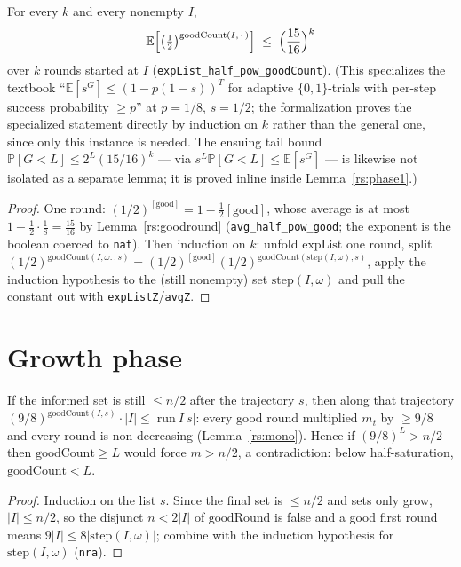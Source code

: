 \begin{lemma}\label{rs:adaptive}
  \rocqok
  For every $k$ and every nonempty $I$,
  \[
    \mathbb{E}\Bigl[\bigl(\tfrac12\bigr)^{\mathrm{goodCount}(I,\,\cdot\,)}\Bigr]
      \;\le\; \Bigl(\frac{15}{16}\Bigr)^{k}
  \]
  over $k$ rounds started at $I$ (\texttt{expList\_half\_pow\_goodCount}).
  (This specializes the textbook
  ``$\mathbb{E}[s^G] \le (1-p(1-s))^T$ for adaptive $\{0,1\}$-trials with
  per-step success probability $\ge p$'' at $p = 1/8$, $s = 1/2$; the
  formalization proves the specialized statement directly by induction on
  $k$ rather than the general one, since only this instance is needed. The
  ensuing tail bound $\mathbb{P}[G < L] \le 2^{L}(15/16)^{k}$ --- via
  $s^{L}\mathbb{P}[G<L] \le \mathbb{E}[s^G]$ --- is likewise not isolated as
  a separate lemma; it is proved inline inside Lemma~\ref{rs:phase1}.)
\end{lemma}
\begin{proof}
  \rocqok
  One round: $(1/2)^{[\mathrm{good}]} = 1 - \tfrac12[\mathrm{good}]$, whose
  average is at most $1 - \tfrac12\cdot\tfrac18 = \tfrac{15}{16}$ by
  Lemma~\ref{rs:goodround} (\texttt{avg\_half\_pow\_good}; the exponent is
  the boolean coerced to \texttt{nat}). Then induction on $k$: unfold
  $\mathrm{expList}$ one round, split
  $(1/2)^{\mathrm{goodCount}(I, \omega :: s)} = (1/2)^{[\mathrm{good}]}
  (1/2)^{\mathrm{goodCount}(\mathrm{step}(I,\omega), s)}$, apply the
  induction hypothesis to the (still nonempty) set
  $\mathrm{step}(I,\omega)$ and pull the constant out with
  \texttt{expListZ}/\texttt{avgZ}.
\end{proof}

\section{Growth phase}\label{rs:sec:growth}

\begin{lemma}\label{rs:force}
  \rocqok
  If the informed set is still $\le n/2$ after the trajectory $s$, then
  along that trajectory
  $(9/8)^{\mathrm{goodCount}(I, s)} \cdot |I| \le |\mathrm{run}\ I\ s|$:
  every good round multiplied $m_t$ by $\ge 9/8$ and every round is
  non-decreasing (Lemma~\ref{rs:mono}). Hence if $(9/8)^L > n/2$ then
  $\mathrm{goodCount} \ge L$ would force $m > n/2$, a contradiction: below
  half-saturation, $\mathrm{goodCount} < L$.
\end{lemma}
\begin{proof}
  \rocqok
  Induction on the list $s$. Since the final set is $\le n/2$ and sets only
  grow, $|I| \le n/2$, so the disjunct $n < 2|I|$ of $\mathrm{goodRound}$ is
  false and a good first round means $9|I| \le 8|\mathrm{step}(I,\omega)|$;
  combine with the induction hypothesis for $\mathrm{step}(I,\omega)$
  (\texttt{nra}).
\end{proof}

